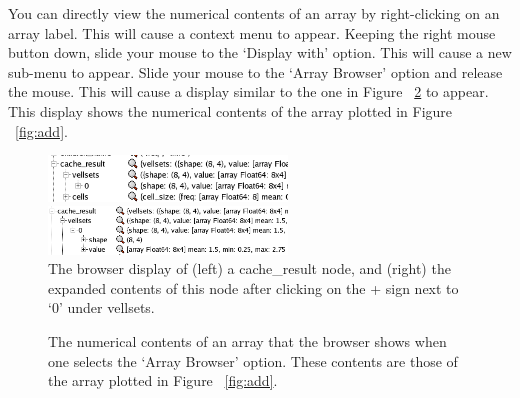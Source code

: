 \documentclass[10pt]{article}
\begin{document}
You can directly view the numerical contents of an array by right-clicking
on an array label. This will cause a context menu to appear. Keeping
the right mouse button down, slide your mouse to the `Display with' option.
This will cause a new sub-menu to appear. Slide your mouse to the
`Array Browser' option and release the mouse. This will cause a
display similar to the one in  Figure ~\ref{fig:ArrayBrowser}
to appear. This display shows the numerical contents of the array
plotted in Figure ~\ref{fig:add}.


\begin{figure}
  \centering
  \begin{minipage}[c]{0.5\textwidth}
     \centering \includegraphics[width=2.5in]{FiguresAndDiagrams/browser_small1}
  \end{minipage}%
  \begin{minipage}[c]{0.5\textwidth}
     \centering \includegraphics[width=2.5in]{FiguresAndDiagrams/browser_small2}
  \end{minipage}
  \caption {The browser display of (left) a cache\_result node, and 
(right) the expanded contents of this node after clicking on the
+ sign next to `0' under vellsets.}
  \label{fig:ArraySelect}
\end{figure}

\begin{figure}
{\par\centering
{}
\par}
\caption {The numerical contents of an array that the browser shows
when one selects the `Array Browser' option. 
These contents are those of the array plotted in Figure ~\ref{fig:add}.}
\label{fig:ArrayBrowser}
\end{figure}
\end{document}
